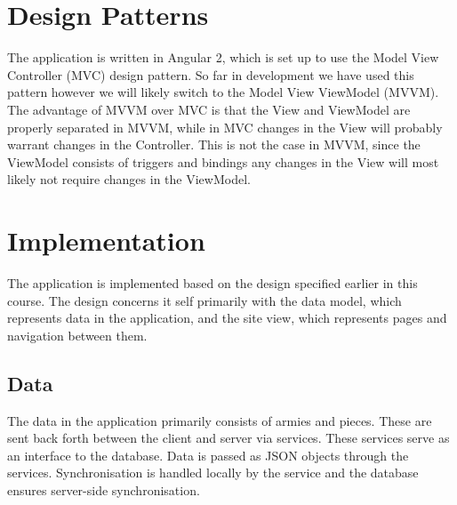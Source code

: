 \documentclass[10pt,a4paper]{report}
\begin{document}
\section{Design Patterns}
The application is written in Angular 2, which is set up to use the Model View Controller (MVC) design pattern. So far in development we have used this pattern however we will likely switch to the Model View ViewModel (MVVM). The advantage of MVVM over MVC is that the View and ViewModel are properly separated in MVVM, while in MVC changes in the View will probably warrant changes in the Controller. This is not the case in MVVM, since the ViewModel consists of triggers and bindings any changes in the View will most likely not require changes in the ViewModel.

\section{Implementation}
The application is implemented based on the design specified earlier in this course. The design concerns it self primarily with the data model, which represents data in the application, and the site view, which represents pages and navigation between them.

\subsection{Data}
The data in the application primarily consists of armies and pieces. These are sent back forth between the client and server via services. These services serve as an interface to the database. Data is passed as JSON objects through the services. Synchronisation is handled locally by the service and the database ensures server-side synchronisation.

\begin{center}
\end{center}
\end{document}
